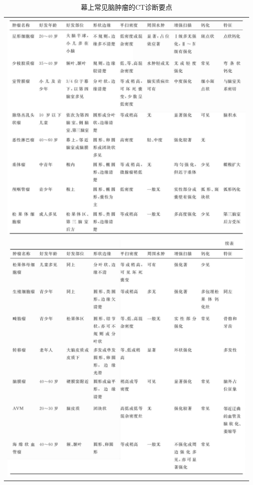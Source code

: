 \begin{longtable}{c}
  \caption{幕上常见脑肿瘤的CT诊断要点}
\label{tab2-7}\\
\endfirsthead
\caption[]{幕上常见脑肿瘤的CT诊断要点}
\endhead
\includegraphics[width=\textwidth,height=\textheight,keepaspectratio]{./images/Image00085.jpg}\\
\includegraphics[width=\textwidth,height=\textheight,keepaspectratio]{./images/Image00086.jpg}
\end{longtable}



